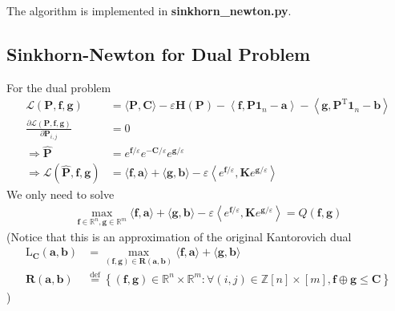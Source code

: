 \documentclass{article}
\begin{document}
\begin{large}
The algorithm is implemented in \textbf{sinkhorn\_newton.py}.

\subsection{Sinkhorn-Newton for Dual Problem}
For the dual problem
\begin{align}
\mathcal { L } ( \mathbf { P } , \mathbf { f } , \mathbf { g } ) &= \langle \mathbf { P } , \mathbf { C } \rangle - \varepsilon \mathbf { H } ( \mathbf { P } ) - \left\langle \mathbf { f } , \mathbf { P } \mathbf { 1 } _ { n } - \mathbf { a } \right\rangle - \left\langle \mathbf { g } , \mathbf { P } ^ { \mathrm { T } } \mathbf{ 1 } _ { n } - \mathbf { b } \right\rangle\\
\frac { \partial \mathcal { L } ( \mathbf { P } , \mathbf { f } , \mathbf { g } ) } { \partial \mathbf { P } _ { i , j } } &=0\\
\Rightarrow\hat{\mathbf { P }} &= e ^ { \mathbf { f }  / \varepsilon } e ^ { - \mathbf { C } / \varepsilon } e ^ { \mathbf { g }/ \varepsilon }\\
\Rightarrow \mathcal{L}( \hat{\mathbf { P }} , \mathbf { f } , \mathbf { g } ) &= \langle \mathbf { f } , \mathbf { a } \rangle + \langle \mathbf { g } , \mathbf { b } \rangle - \varepsilon \left\langle e ^ { \mathbf { f } / \varepsilon } , \mathbf { K } e ^ { \mathbf { g } / \varepsilon } \right\rangle
\end{align}
We only need to solve
\begin{align}
\max _ { \mathbf { f } \in \mathbb { R } ^ { n } , \mathbf { g } \in \mathbb { R } ^ { m } } \langle \mathbf { f } , \mathbf { a } \rangle + \langle \mathbf { g } , \mathbf { b } \rangle - \varepsilon \left\langle e ^ { \mathbf { f } / \varepsilon } , \mathbf { K } e ^ { \mathbf { g } / \varepsilon } \right\rangle = Q ( \mathbf { f } , \mathbf { g } )
\end{align}
(Notice that this is an approximation of the original Kantorovich dual
\begin{align}
\mathrm { L } _ { \mathbf { C } } ( \mathbf { a } , \mathbf { b } ) &= \max _ { ( \mathbf { f } , \mathbf { g } ) \in \mathbf { R } ( \mathbf { a } , \mathbf { b } ) } \langle \mathbf { f } , \mathbf { a } \rangle + \langle \mathbf { g } , \mathbf { b } \rangle\\
\mathbf { R } ( \mathbf { a } , \mathbf { b } ) &\stackrel { \mathrm { def } } { = } \left\{ ( \mathbf { f } , \mathbf { g } ) \in \mathbb { R } ^ { n } \times \mathbb { R } ^ { m } : \forall ( i , j ) \in \mathbb { Z } [ n ] \times [ m ] , \mathbf { f } \oplus \mathbf { g } \leq \mathbf { C } \right\}
\end{align}
)


\end{large}
\end{document}
